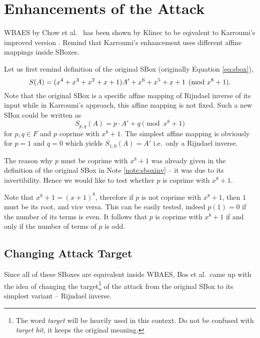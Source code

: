 \section{Enhancements of the Attack}   %

WBAES by Chow et al.\ \cite{chow2003aes} has been shown by Klinec \cite{klinec2013white} to be eqivalent to Karroumi's improved version \cite{karroumi2011protecting}. Remind that Karroumi's enhancement uses different affine mappings inside SBoxes. %

Let us first remind definition of the original SBox (originally Equation \ref{eq:sbox}),
\[
	S(A) = (x^4 + x^3 + x^2 + x + 1)A' + x^6 + x^5 + x + 1 \pmod{x^8+1} .
\]
Note that the original SBox is a specific affine mapping of Rijndael inverse of its input while in Karroumi's approach, this affine mapping is not fixed. Such a new SBox could be written as
\begin{equation}
\label{eq:spq}
	S_{p,q}(A) = p\cdot A' + q \pmod{x^8+1}
\end{equation}
for $p,q\in F$ and $p$ coprime with $x^8+1$. The simplest affine mapping is obviously for $p=1$ and $q=0$ which yields $S_{1,0}(A) = A'$ i.e.\ only a Rijndael inverse.

\begin{remark}
\label{rem:coprime}
	The reason why $p$ must be coprime with $x^8+1$ was already given in the definition of the original SBox in Note \ref{note:sboxinv} -- it was due to its invertibility. Hence we would like to test whether $p$ is coprime with $x^8+1$.
	
	Note that $x^8+1 = (x+1)^8$, therefore if $p$ is not coprime with $x^8+1$, then $1$ must be its root, and vice versa. This can be easily tested, indeed $p(1) = 0$ if the number of its terms is even. It follows that $p$ is coprime with $x^8+1$ if and only if the number of terms of $p$ is odd.
\end{remark}



\subsection{Changing Attack Target}

Since all of these SBoxes are equivalent inside WBAES, Bos et al.\ came up with the idea of changing the target\footnote{The word {\em target} will be heavily used in this context. Do not be confused with {\em target bit}, it keeps the original meaning.} of the attack from the original SBox to its simplest variant -- Rijndael inverse.

